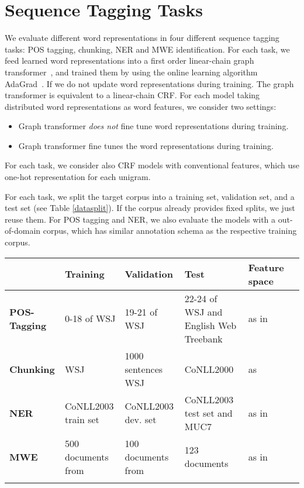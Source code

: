 \section{Sequence Tagging Tasks}
\label{sec:SeqTagging}

We evaluate different word representations in four different sequence tagging tasks: POS tagging, chunking, NER and MWE identification. For each task, we feed learned word representations into a first order linear-chain graph transformer~\cite{collobert2011natural}, and trained them by using the online learning algorithm AdaGrad~\cite{duchi2011adaptive}. If we do not update word representations during training. The graph transformer is equivalent to a linear-chain CRF. For each model taking distributed word representations as word features, we consider two settings: 
\begin{small}
\begin{itemize}
\item[-] Graph transformer \textit{does not} fine tune word representations during training.
\item[-] Graph transformer fine tunes the word representations during training.
\end{itemize}
\end{small}
For each task, we consider also CRF models with conventional features, which use one-hot representation for each unigram.

For each task, we split the target corpus into a training set, validation set, and a test set (see Table \ref{datasplit}). If the corpus already provides fixed splits, we just reuse them. For POS tagging and NER, we also evaluate the models with a out-of-domain corpus, which has similar annotation schema as the respective training corpus.

\begin{table*}
\begin{small}
\begin{tabular}{lllp{3cm}ll}
\hline
			& \textbf{Training} & \textbf{Validation} & \textbf{Test} & \textbf{Feature space} \\ \hline
\textbf{POS-Tagging} & 0-18 of WSJ & 19-21 of WSJ & 22-24 of WSJ and English Web Treebank & as in~\cite{collobert2011natural} \\
\textbf{Chunking} & WSJ & 1000 sentences WSJ & CoNLL2000 & as~\cite{turian2010word}\\
\textbf{NER} & CoNLL2003 train set & CoNLL2003 dev. set & CoNLL2003 test set and MUC7 & as in~\cite{turian2010word} \\
\textbf{MWE} & 500 documents from & 100 documents from & 123 documents & as in~\cite{mwecorpus}\\
\hline
\label{datasplit}
\caption{Datasets and features for each task.}
\end{tabular}
\end{small}
\end{table*}

